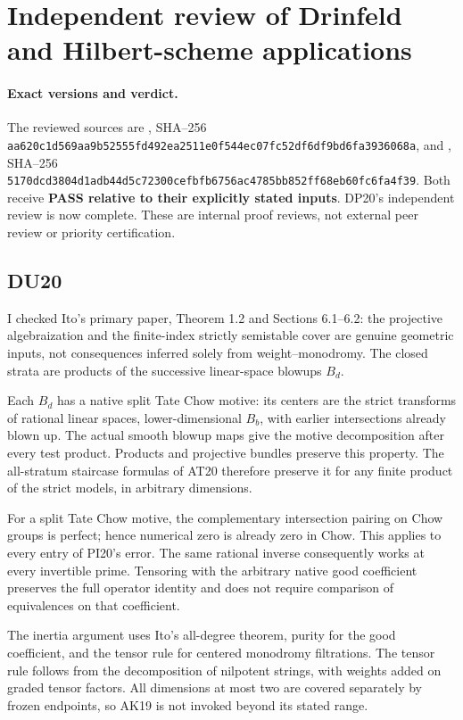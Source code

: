 \section{Independent review of Drinfeld and Hilbert-scheme applications}
\label{r20audit:DUHMroot}

\paragraph{Exact versions and verdict.}
The reviewed sources are
,
SHA--256
\texttt{aa620c1d569aa9b52555fd492ea2511e0f544ec07fc52df6df9bd6fa3936068a},
and
,
SHA--256
\texttt{5170dcd3804d1adb44d5c72300cefbfb6756ac4785bb852ff68eb60fc6fa4f39}.
Both receive \textbf{PASS relative to their explicitly stated inputs}.
DP20's independent review is now complete. These are internal proof
reviews, not external peer review or priority certification.

\subsection{DU20}
I checked Ito's primary paper, Theorem 1.2 and Sections 6.1--6.2:
the projective algebraization and the finite-index strictly semistable
cover are genuine geometric inputs, not consequences inferred solely
from weight--monodromy. The closed strata are products of the
successive linear-space blowups $B_d$.

Each $B_d$ has a native split Tate Chow motive: its centers are the
strict transforms of rational linear spaces, lower-dimensional $B_b$,
with earlier intersections already blown up. The actual smooth blowup
maps give the motive decomposition after every test product.
Products and projective bundles preserve this property. The
all-stratum staircase formulas of AT20 therefore preserve it for any
finite product of the strict models, in arbitrary dimensions.

For a split Tate Chow motive, the complementary intersection pairing
on Chow groups is perfect; hence numerical zero is already zero in
Chow. This applies to every entry of PI20's error. The same rational
inverse consequently works at every invertible prime. Tensoring with
the arbitrary native good coefficient preserves the full operator
identity and does not require comparison of equivalences on that
coefficient.

The inertia argument uses Ito's all-degree theorem, purity for the
good coefficient, and the tensor rule for centered monodromy
filtrations. The tensor rule follows from the decomposition of
nilpotent strings, with weights added on graded tensor factors.
All dimensions at most two are covered separately by frozen endpoints,
so AK19 is not invoked beyond its stated range.

